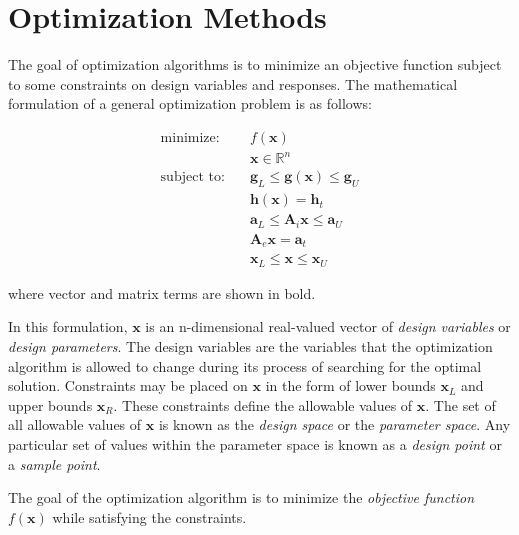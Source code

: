 \section{Optimization Methods}
\label{sec:bg:opt}

The goal of optimization algorithms is to minimize an objective function subject to some constraints on design variables and responses.
The mathematical formulation of a general optimization problem is as follows:

\begin{equation}\begin{split}
  \mbox{minimize:}  \quad & f\left(\textbf{x}\right) \\
                          & \textbf{x} \in \mathbb{R}^n \\
  \mbox{subject to:}\quad & \textbf{g}_L \leq \textbf{g}\left(\textbf{x}\right) \leq \textbf{g}_U \\
                          & \textbf{h}\left(\textbf{x}\right) = \textbf{h}_t \\
                          & \textbf{a}_L \leq \textbf{A}_i\textbf{x} \leq \textbf{a}_U \\
                          & \textbf{A}_e\textbf{x} = \textbf{a}_t \\
                          & \textbf{x}_L \leq \textbf{x} \leq \textbf{x}_U
\end{split}\end{equation}

where vector and matrix terms are shown in bold.

In this formulation, $\textbf{x}$ is an n-dimensional real-valued vector of \textit{design variables} or \textit{design parameters}.
The design variables are the variables that the optimization algorithm is allowed to change during its process of searching for the optimal solution.
Constraints may be placed on $\textbf{x}$ in the form of lower bounds $\textbf{x}_L$ and upper bounds $\textbf{x}_R$.
These constraints define the allowable values of $\textbf{x}$.
The set of all allowable values of $\textbf{x}$ is known as the \textit{design space} or the \textit{parameter space}.
Any particular set of values within the parameter space is known as a \textit{design point} or a \textit{sample point}.

The goal of the optimization algorithm is to minimize the \textit{objective function} $f\left(\textbf{x}\right)$ while satisfying the constraints.

